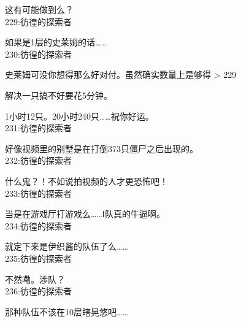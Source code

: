 这有可能做到么？\\

229:彷徨的探索者

如果是1层的史莱姆的话……\\

230:彷徨的探索者

史莱姆可没你想得那么好对付。虽然确实数量上是够得 > 229

解决一只搞不好要花5分钟。

1小时12只。20小时240只……祝你好运。\\

231:彷徨的探索者

好像视频里的别墅是在打倒373只僵尸之后出现的。\\

232:彷徨的探索者

什么鬼？！不如说拍视频的人才更恐怖吧！\\

233:彷徨的探索者

当是在游戏厅打游戏么……Ⅰ队真的牛逼啊。\\

234:彷徨的探索者

就定下来是伊织酱的队伍了么……\\

235:彷徨的探索者

不然嘞。涉队？\\

236:彷徨的探索者

那种队伍不该在10层瞎晃悠吧……\\

